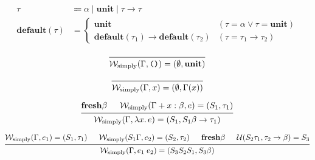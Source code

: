 \documentclass[12pt]{article}
\begin{document}
\pagestyle{empty}

\begin{align*}
    \tau &\Coloneqq \alpha \mid \mathbf{unit} \mid \tau \to \tau \\
    \mathbf{default}(\tau) &= \left\{\begin{array}{ll}
        \mathbf{unit} &(\tau = \alpha \lor \tau = \mathbf{unit}) \\
        \mathbf{default}(\tau_1) \to \mathbf{default}(\tau_2) &(\tau = \tau_1 \to \tau_2)
    \end{array}\right.
\end{align*}

\[
    \begin{prooftree}
        \infer0{\mathcal{W}_{\text{simply}}(\Gamma, \text{\texttt{()}}) = (\emptyset, \mathbf{unit})}
    \end{prooftree}
\]

\[
    \begin{prooftree}
        \infer0{\mathcal{W}_{\text{simply}}(\Gamma, x) = (\emptyset, \Gamma(x))}
    \end{prooftree}
\]

\[
    \begin{prooftree}
        \hypo{\mathbf{fresh} \beta}
        \hypo{\mathcal{W}_{\text{simply}}(\Gamma + x:\beta, e) = (S_1, \tau_1)}
        \infer2{\mathcal{W}_{\text{simply}}(\Gamma, \lambda x\ldotp e) = (S_1, S_1\beta \to \tau_1)}
    \end{prooftree}
\]

\[
    \begin{prooftree}
        \hypo{\mathcal{W}_{\text{simply}}(\Gamma, e_1) = (S_1, \tau_1)}
        \hypo{\mathcal{W}_{\text{simply}}(S_1\Gamma, e_2) = (S_2, \tau_2)}
        \hypo{\mathbf{fresh} \beta}
        \hypo{\mathcal{U}(S_2\tau_1, \tau_2 \to \beta) = S_3}
        \infer4{\mathcal{W}_{\text{simply}}(\Gamma, e_1\; e_2) = (S_3S_2S_1, S_3\beta)}
    \end{prooftree}
\]
\end{document}
